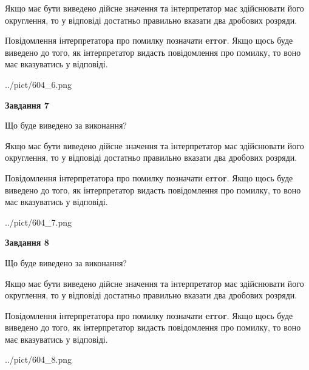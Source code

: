 \documentclass[12pt, ukrainian]{article}
\begin{document}
{\begin {Large}
Якщо має бути виведено дійсне значення та інтерпретатор має здійснювати його округлення, 
то у відповіді достатньо правильно вказати два дробових розряди.

Повідомлення інтерпретатора про помилку позначати \textbf{error}.
Якщо щось буде виведено до того, як інтерпретатор видасть повідомлення про помилку, 
то воно має вказуватись у відповіді. \par

\begin{center}
	{../pict/604_6.png}
\end{center}
\newpage

{\begin {center}\textbf{Завдання 7}\end {center}}\par
Що буде виведено за виконання? \par

Якщо має бути виведено дійсне значення та інтерпретатор має здійснювати його округлення, 
то у відповіді достатньо правильно вказати два дробових розряди.

Повідомлення інтерпретатора про помилку позначати \textbf{error}.
Якщо щось буде виведено до того, як інтерпретатор видасть повідомлення про помилку, 
то воно має вказуватись у відповіді. \par

\begin{center}
	{../pict/604_7.png}
\end{center}
\newpage

{\begin {center}\textbf{Завдання 8}\end {center}}\par
Що буде виведено за виконання? \par

Якщо має бути виведено дійсне значення та інтерпретатор має здійснювати його округлення, 
то у відповіді достатньо правильно вказати два дробових розряди.

Повідомлення інтерпретатора про помилку позначати \textbf{error}.
Якщо щось буде виведено до того, як інтерпретатор видасть повідомлення про помилку, 
то воно має вказуватись у відповіді. \par

\begin{center}
	{../pict/604_8.png}
\end{center}
\newpage


\end{Large}}
\end{document}

